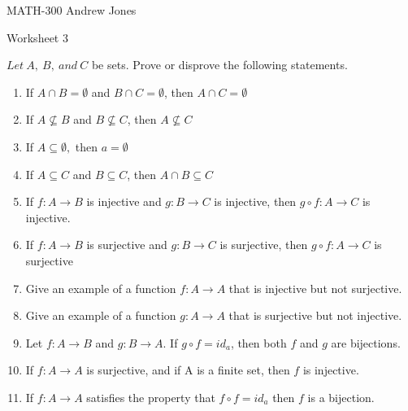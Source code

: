 \documentclass{article}
\begin{document}
  MATH-300 \hfill Andrew Jones
  \begin{center}
  {\huge Worksheet 3}
  \end{center}
  $Let\ A,\ B,\ and\ C$ be sets. Prove or disprove the following statements. \\
  \begin{enumerate}
  \item If $A\cap B = \emptyset$ and $B\cap C = \emptyset$, then $A\cap C = \emptyset$ 
  \item If $A\not\subseteq B$ and $B\not\subseteq C$, then $A\not\subseteq C$ 
  \item If $A\subseteq \emptyset,$ then $a= \emptyset$ 
  \item If $A\subseteq C$ and $B\subseteq C$, then $A\cap B\subseteq C$
  \item If $f : A\to B$ is injective and $g : B\to C$ is injective, then $g \circ f : A\to C$ is injective. 
  \item If $f : A\to B$ is surjective and $g : B\to C$ is surjective, then $g \circ f : A\to C$ is surjective 
  \item Give an example of a function $f : A\to A$ that is injective but not surjective. 
  \item Give an example of a function $g : A\to A$ that is surjective but not injective. 
  \item Let $f : A\to B$ and $g : B\to A$. If $g \circ f = id_{a}$, then both $f$ and $g$ are bijections.
  \item If $f : A\to A$ is surjective, and if A is a finite set, then $f$ is injective.
  \item If $f : A\to A$ satisfies the property that $f \circ f = id_{a}$ then $f$ is a bijection.
  \end{enumerate}
\end{document}
